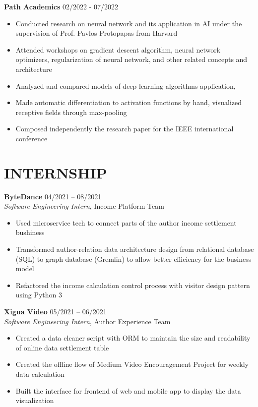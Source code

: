 \documentclass[margin,line]{res}
\begin{document}
\begin{resume}
\textbf{Path Academics} \hfill 02/2022 - 07/2022 \\
\begin{itemize}
	\item Conducted research on neural network and its application in AI under the supervision of Prof. Pavlos Protopapas from Harvard 
	\item Attended workshops on gradient descent algorithm, neural network optimizers,
		regularization of neural network, and other related concepts and architecture 
	\item Analyzed and compared models of deep learning algorithms application, 
	\item Made automatic differentiation to activation functions by hand, visualized receptive fields through max-pooling
	\item Composed independently the research paper for the IEEE international conference 
\end{itemize}

\section{\sc INTERNSHIP}
\textbf{ByteDance} \hfill {04/2021 -- 08/2021} \\
\textit{Software Engineering Intern}, {Income Platform Team}
\begin{itemize}
	\item Used microservice tech to connect parts of the author income settlement bushiness
	\item Transformed author-relation data architecture design from relational database (SQL) to graph database (Gremlin) to allow better eﬀiciency for the business model
	\item Refactored the income calculation control process with visitor design pattern using Python 3
\end{itemize}

\textbf{Xigua Video} \hfill {05/2021 -- 06/2021} \\
\textit{Software Engineering Intern}, {Author Experience Team}
\begin{itemize}
	\item Created a data cleaner script with ORM to maintain the size and readability of online data settlement table 
	\item Created the offline flow of Medium Video Encouragement Project for weekly data calculation
	\item Built the interface for frontend of web and mobile app to display the data visualization 
\end{itemize}


\end{resume}
\end{document}

